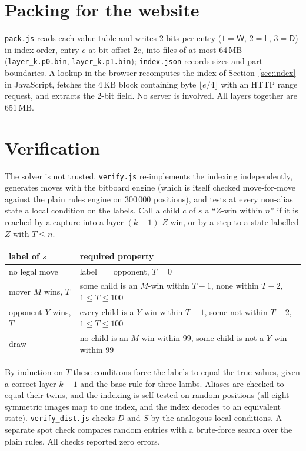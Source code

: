 \documentclass[11pt,a4paper]{article}
\newcommand{\W}{\mathsf{W}}
\newcommand{\Lb}{\mathsf{L}}
\newcommand{\D}{\mathsf{D}}
\begin{document}
\section{Packing for the website}

\texttt{pack.js} reads each value table and writes 2 bits per entry
($1=\W$, $2=\Lb$, $3=\D$) in index order, entry $e$ at bit offset $2e$, into
files of at most 64\,MB (\texttt{layer\_k.p0.bin}, \texttt{layer\_k.p1.bin});
\texttt{index.json} records sizes and part boundaries. A lookup in the browser
recomputes the index of Section~\ref{sec:index} in JavaScript, fetches the 4\,KB
block containing byte $\lfloor e/4\rfloor$ with an HTTP range request, and
extracts the 2-bit field. No server is involved. All layers together are
651\,MB.

\section{Verification}

The solver is not trusted. \texttt{verify.js} re-implements the indexing
independently, generates moves with the bitboard engine (which is itself
checked move-for-move against the plain rules engine on 300\,000 positions), and
tests at every non-alias state a local condition on the labels. Call a child $c$
of $s$ a ``$Z$-win within $n$'' if it is reached by a capture into a layer-$(k-1)$
$Z$ win, or by a step to a state labelled $Z$ with $T\le n$.

\begin{center}\small
\begin{tabular}{@{}lp{10.5cm}@{}}
\toprule
label of $s$ & required property \\
\midrule
no legal move & label $=$ opponent, $T=0$ \\
mover $M$ wins, $T$ & some child is an $M$-win within $T-1$, none within $T-2$, $1\le T\le100$ \\
opponent $Y$ wins, $T$ & every child is a $Y$-win within $T-1$, some not within $T-2$, $1\le T\le100$ \\
draw & no child is an $M$-win within 99, some child is not a $Y$-win within 99 \\
\bottomrule
\end{tabular}
\end{center}

By induction on $T$ these conditions force the labels to equal the true values,
given a correct layer $k-1$ and the base rule for three lambs. Aliases are
checked to equal their twins, and the indexing is self-tested on random positions
(all eight symmetric images map to one index, and the index decodes to an
equivalent state). \texttt{verify\_dist.js} checks $D$ and $S$ by the analogous
local conditions. A separate spot check compares random entries with a
brute-force search over the plain rules. All checks reported zero errors.
\end{document}
